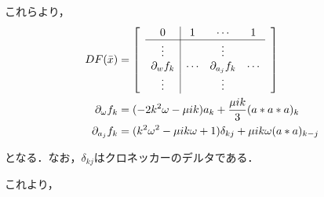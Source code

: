 \documentclass[11pt,a4paper]{jsarticle}
\theoremstyle{definition}
\begin{document}
これらより，
\begin{equation*}
  \begin{split}
    DF(\bar{x}) &=
    \begin{bmatrix}
       & \multicolumn{1}{c|}{0} & 1  & \cdots & 1  & \\ \cline{2-5}
       & \multicolumn{1}{c|}{\vdots} & & \vdots & &  \\
       & \multicolumn{1}{c|}{\partial_w f_k} & \cdots & \partial_{a_j}f_k & \cdots & \\
       & \multicolumn{1}{c|}{\vdots} & & \vdots & &
    \end{bmatrix}\\
    \partial_\omega f_k &= (-2k^2\omega-\mu ik)a_k + \frac{\mu ik}{3} (a*a*a)_k \\
    \partial_{a_j} f_k &= (k^2\omega^2-\mu ik\omega +1)\delta_{kj} + \mu ik \omega (a*a)_{k-j}
  \end{split}
\end{equation*}

となる．なお，$\delta_{kj}$はクロネッカーのデルタである．

これより，
\end{document}
